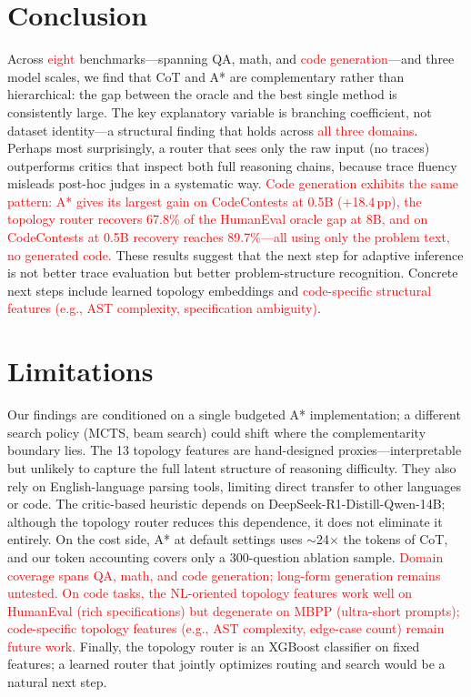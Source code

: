 \documentclass[10pt]{article}
\begin{document}
\section{Conclusion}
Across \textcolor{red}{eight} benchmarks---spanning QA, math, and \textcolor{red}{code generation}---and three model scales, we find that CoT and A* are complementary rather than hierarchical: the gap between the oracle and the best single method is consistently large. The key explanatory variable is branching coefficient, not dataset identity---a structural finding that holds across \textcolor{red}{all three domains}. Perhaps most surprisingly, a router that sees only the raw input (no traces) outperforms critics that inspect both full reasoning chains, because trace fluency misleads post-hoc judges in a systematic way. \textcolor{red}{Code generation exhibits the same pattern: A* gives its largest gain on CodeContests at 0.5B (+18.4\,pp), the topology router recovers 67.8\% of the HumanEval oracle gap at 8B, and on CodeContests at 0.5B recovery reaches 89.7\%---all using only the problem text, no generated code.} These results suggest that the next step for adaptive inference is not better trace evaluation but better problem-structure recognition. Concrete next steps include learned topology embeddings and \textcolor{red}{code-specific structural features (e.g., AST complexity, specification ambiguity)}.

\section*{Limitations}
\label{sec:limitations}
Our findings are conditioned on a single budgeted A* implementation; a different search policy (MCTS, beam search) could shift where the complementarity boundary lies. The 13 topology features are hand-designed proxies---interpretable but unlikely to capture the full latent structure of reasoning difficulty. They also rely on English-language parsing tools, limiting direct transfer to other languages or code. The critic-based heuristic depends on DeepSeek-R1-Distill-Qwen-14B; although the topology router reduces this dependence, it does not eliminate it entirely. On the cost side, A* at default settings uses $\sim$24$\times$ the tokens of CoT, and our token accounting covers only a 300-question ablation sample. \textcolor{red}{Domain coverage spans QA, math, and code generation; long-form generation remains untested. On code tasks, the NL-oriented topology features work well on HumanEval (rich specifications) but degenerate on MBPP (ultra-short prompts); code-specific topology features (e.g., AST complexity, edge-case count) remain future work.} Finally, the topology router is an XGBoost classifier on fixed features; a learned router that jointly optimizes routing and search would be a natural next step.
\end{document}
